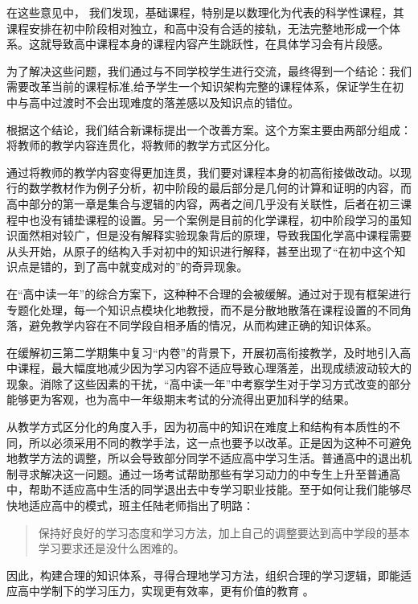 \documentclass[12pt,UTF8]{ctexart}
\begin{document}
\par {
	在这些意见中，
	我们发现，基础课程，特别是以数理化为代表的科学性课程，其课程安排在初中阶段相对独立，和高中没有合适的接轨，无法完整地形成一个体系。这就导致高中课程本身的课程内容产生跳跃性，在具体学习会有片段感。
}
\par {
	
	为了解决这些问题，我们通过与不同学校学生进行交流，最终得到一个结论：我们需要改革当前的课程标准,给予学生一个知识架构完整的课程体系，保证学生在初中与高中过渡时不会出现难度的落差感以及知识点的错位。
}
\par {
	根据这个结论，我们结合新课标提出一个改善方案。这个方案主要由两部分组成：将教师的教学内容连贯化，将教师的教学方式区分化。
}
\par {
	
	通过将教师的教学内容变得更加连贯，我们要对课程本身的初高衔接做改动。以现行的数学教材作为例子分析，初中阶段的最后部分是几何的计算和证明的内容，而高中部分的第一章是集合与逻辑的内容，两者之间几乎没有关联性，后者在初三课程中也没有铺垫课程的设置。另一个案例是目前的化学课程，初中阶段学习的虽知识面然相对较广，但是没有解释实验现象背后的原理，导致我国化学高中课程需要从头开始，从原子的结构入手对初中的知识进行解释，甚至出现了“在初中这个知识点是错的，到了高中就变成对的”的奇异现象。
}
\par {
	
	在“高中读一年”的综合方案下，这种种不合理的会被缓解。通过对于现有框架进行专题化处理，每一个知识点模块化地教授，而不是分散地散落在课程设置的不同角落，避免教学内容在不同学段自相矛盾的情况，从而构建正确的知识体系。
}
\par {
	
	在缓解初三第二学期集中复习“内卷”的背景下，开展初高衔接教学，及时地引入高中课程，最大幅度地减少因为学习内容不适应导致心理落差，出现成绩波动较大的现象。消除了这些因素的干扰，“高中读一年”中考察学生对于学习方式改变的部分能够更为客观，也为高中一年级期末考试的分流得出更加科学的结果。
}
\par {
	
	从教学方式区分化的角度入手，因为初高中的知识在难度上和结构有本质性的不同，所以必须采用不同的教学手法，这一点也要予以改革。正是因为这种不可避免地教学方法的调整，所以会导致部分同学不适应高中学习生活。普通高中的退出机制寻求解决这一问题。通过一场考试帮助那些有学习动力的中专生上升至普通高中，帮助不适应高中生活的同学退出去中专学习职业技能。至于如何让我们能够尽快地适应高中的模式，班主任陆老师指出了明路：
	\begin{quote}
		\kaishu 保持好良好的学习态度和学习方法，加上自己的调整要达到高中学段的基本学习要求还是没什么困难的。
	\end{quote}
}
\par {
	因此，构建合理的知识体系，寻得合理地学习方法，组织合理的学习逻辑，即能适应高中学制下的学习压力，实现更有效率，更有价值的教育 。
}
\end{document}
